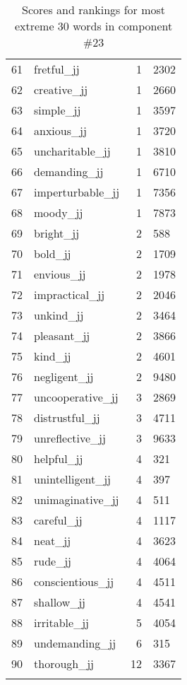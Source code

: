 \begin{longtable}[!htbp]{| rlr@{.}l |}
    61 & fretful\_jj & 1 & 2302 \\
    62 & creative\_jj & 1 & 2660 \\
    63 & simple\_jj & 1 & 3597 \\
    64 & anxious\_jj & 1 & 3720 \\
    65 & uncharitable\_jj & 1 & 3810 \\
    66 & demanding\_jj & 1 & 6710 \\
    67 & imperturbable\_jj & 1 & 7356 \\
    68 & moody\_jj & 1 & 7873 \\
    69 & bright\_jj & 2 & 588 \\
    70 & bold\_jj & 2 & 1709 \\
    71 & envious\_jj & 2 & 1978 \\
    72 & impractical\_jj & 2 & 2046 \\
    73 & unkind\_jj & 2 & 3464 \\
    74 & pleasant\_jj & 2 & 3866 \\
    75 & kind\_jj & 2 & 4601 \\
    76 & negligent\_jj & 2 & 9480 \\
    77 & uncooperative\_jj & 3 & 2869 \\
    78 & distrustful\_jj & 3 & 4711 \\
    79 & unreflective\_jj & 3 & 9633 \\
    80 & helpful\_jj & 4 & 321 \\
    81 & unintelligent\_jj & 4 & 397 \\
    82 & unimaginative\_jj & 4 & 511 \\
    83 & careful\_jj & 4 & 1117 \\
    84 & neat\_jj & 4 & 3623 \\
    85 & rude\_jj & 4 & 4064 \\
    86 & conscientious\_jj & 4 & 4511 \\
    87 & shallow\_jj & 4 & 4541 \\
    88 & irritable\_jj & 5 & 4054 \\
    89 & undemanding\_jj & 6 & 315 \\
    90 & thorough\_jj & 12 & 3367 \\
    \hline
    \caption{Scores and rankings for most extreme 30 words in component \#23} \\
\end{longtable}
